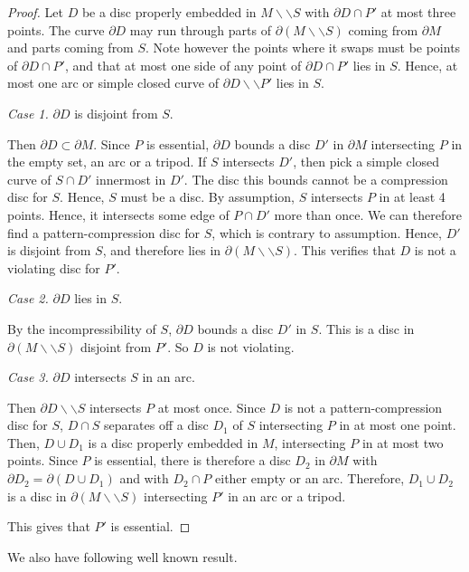 \documentclass[oneside]{amsart}
\numberwithin{equation}{section}
\theoremstyle{plain}
\theoremstyle{definition}
\newcommand{\cut}{\backslash\backslash}
\begin{document}
\begin{proof}
Let $D$ be a disc properly embedded in $M \cut S$ with $\partial D \cap P'$ at most three points. The curve $\partial D$ may run through parts of $\partial (M \cut S)$ coming from $\partial M$ and parts coming from $S$. Note however the points where it swaps must be points of $\partial D \cap P'$, and that at most one side of any point of $\partial D \cap P'$ lies in $S$. Hence, at most one arc or simple closed curve of $\partial D \cut P'$ lies in $S$.

\medskip
\emph{Case 1.} $\partial D$ is disjoint from $S$.
\medskip

Then $\partial D \subset \partial M$. Since $P$ is essential, $\partial D$ bounds a disc $D'$ in $\partial M$ intersecting $P$ in the empty set, an arc or a tripod.
If $S$ intersects $D'$, then pick a simple closed curve of $S \cap D'$ innermost in $D'$. The disc this bounds cannot be a compression disc for $S$. Hence, $S$ must be a disc. By assumption, $S$ intersects $P$ in at least 4 points. Hence, it intersects some edge of $P \cap D'$ more than once. We can therefore find a pattern-compression disc for $S$, which is contrary to assumption. Hence, $D'$ is disjoint from $S$, and therefore lies in $\partial (M \cut S)$. This verifies that $D$ is not a violating disc for $P'$.

\medskip
\emph{Case 2.} $\partial D$ lies in $S$.
\medskip

By the incompressibility of $S$, $\partial D$ bounds a disc $D'$ in $S$. This is a disc in $\partial (M \cut S)$ disjoint from $P'$. So $D$ is not violating.

\medskip
\emph{Case 3.} $\partial D$ intersects $S$ in an arc.
\medskip

Then $\partial D \cut S$ intersects $P$ at most once. Since $D$ is not a pattern-compression disc for $S$, $D \cap S$ separates off a disc $D_1$ of $S$ intersecting $P$ in at most one point. Then, $D \cup D_1$ is a disc properly embedded in $M$, intersecting $P$ in at most two points. Since $P$ is essential, there is therefore a disc $D_2$ in $\partial M$ with $\partial D_2 = \partial (D \cup D_1)$ and with $D_2 \cap P$ either empty or an arc. Therefore, $D_1 \cup D_2$ is a disc in $\partial (M \cut S)$ intersecting $P'$ in an arc or a tripod. 

This gives that $P'$ is essential.
\end{proof}

We also have following well known result.
\end{document}
